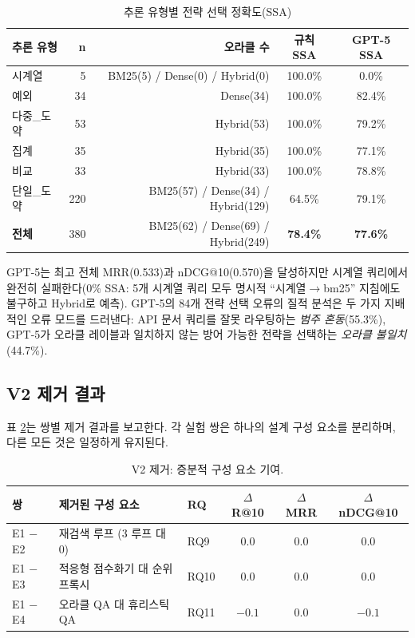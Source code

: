 \documentclass[11pt, a4paper]{article}
\begin{document}
\begin{table}[htbp]
\centering
\caption{추론 유형별 전략 선택 정확도(SSA)}
\label{tab:ssa}
\begin{tabular}{lrrcc}
\toprule
\textbf{추론 유형} & \textbf{n} & \textbf{오라클 수} & \textbf{규칙 SSA} & \textbf{GPT-5 SSA} \\
\midrule
시계열    & 5   & BM25(5) / Dense(0) / Hybrid(0) & 100.0\% & 0.0\%  \\
예외      & 34  & Dense(34)                       & 100.0\% & 82.4\% \\
다중\_도약 & 53  & Hybrid(53)                      & 100.0\% & 79.2\% \\
집계      & 35  & Hybrid(35)                      & 100.0\% & 77.1\% \\
비교      & 33  & Hybrid(33)                      & 100.0\% & 78.8\% \\
단일\_도약 & 220 & BM25(57) / Dense(34) / Hybrid(129) & 64.5\% & 79.1\% \\
\midrule
\textbf{전체} & 380 & BM25(62) / Dense(69) / Hybrid(249) & \textbf{78.4\%} & \textbf{77.6\%} \\
\bottomrule
\end{tabular}
\end{table}

GPT-5는 최고 전체 MRR(0.533)과 nDCG@10(0.570)을 달성하지만 시계열 쿼리에서 완전히 실패한다(0\% SSA: 5개 시계열 쿼리 모두 명시적 ``시계열$\to$bm25'' 지침에도 불구하고 Hybrid로 예측). GPT-5의 84개 전략 선택 오류의 질적 분석은 두 가지 지배적인 오류 모드를 드러낸다: API 문서 쿼리를 잘못 라우팅하는 \emph{범주 혼동}(55.3\%), GPT-5가 오라클 레이블과 일치하지 않는 방어 가능한 전략을 선택하는 \emph{오라클 불일치}(44.7\%).

\subsection{V2 제거 결과}

표 \ref{tab:ablation}는 쌍별 제거 결과를 보고한다. 각 실험 쌍은 하나의 설계 구성 요소를 분리하며, 다른 모든 것은 일정하게 유지된다.

\begin{table}[htbp]
\centering
\caption{V2 제거: 증분적 구성 요소 기여.}
\label{tab:ablation}
\begin{tabular}{lllccc}
\toprule
\textbf{쌍} & \textbf{제거된 구성 요소} & \textbf{RQ} & \textbf{$\Delta$ R@10} & \textbf{$\Delta$ MRR} & \textbf{$\Delta$ nDCG@10} \\
\midrule
E1 $-$ E2 & 재검색 루프 (3 루프 대 0) & RQ9  & $0.0$ & $0.0$ & $0.0$ \\
E1 $-$ E3 & 적응형 점수화기 대 순위 프록시 & RQ10 & $0.0$ & $0.0$ & $0.0$ \\
E1 $-$ E4 & 오라클 QA 대 휴리스틱 QA   & RQ11 & $-0.1$ & $0.0$ & $-0.1$ \\
\bottomrule
\end{tabular}
\end{table}
\end{document}
